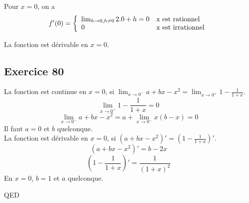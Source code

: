 \documentclass[]{book}
\theoremstyle{definition}
\begin{document}
Pour $x=0$, on a 
$$f'(0) = 
\left\{ 
\begin{array}{l l}
\lim_{h \to 0, h \neq 0} 2.0+h = 0 & \textrm{x est rationnel}\\
0 & \textrm{x est irrationnel}\\
\end{array}
\right. 
$$

La fonction est d\'erivable en $x=0$.


\subsection*{Exercice 80}
La fonction est continue en $x=0$, si $\lim_{x \to 0^{-}} a + bx -x^2 = \lim_{x \to 0^{+}} 1 - \frac{1}{1+x}$.
$$\lim_{x \to 0^{+}} 1 - \frac{1}{1+x} = 0$$
$$\lim_{x \to 0^{-}} a + bx -x^2 = a + \lim_{x \to 0^{-}} x(b-x) = 0$$
Il faut $a=0$ et $b$ quelconque.\\

La fonction est d\'erivable en $x=0$, si $(a + bx -x^2)' = \left(1 - \frac{1}{1+x}\right)'$.
$$(a + bx -x^2)' = b-2x$$
$$\left(1 - \frac{1}{1+x}\right)' = \frac{1}{(1+x)^2}$$
En $x=0$, $b=1$ et $a$ quelconque.

QED
\end{document}
